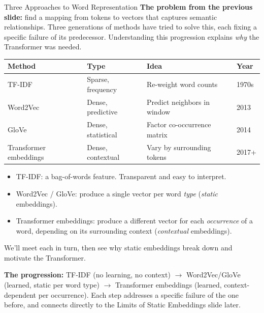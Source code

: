 \documentclass[10pt,english,aspectratio=169]{beamer}
\begin{document}
\begin{frame}{Three Approaches to Word Representation}
\textbf{The problem from the previous slide:} find a mapping from tokens to vectors that captures semantic relationships. Three generations of methods have tried to solve this, each fixing a specific failure of its predecessor. Understanding this progression explains \emph{why} the Transformer was needed.
\medskip
\begin{center}
\renewcommand{\arraystretch}{1.3}
\begin{tabular}{l l l l}
\toprule
\textbf{Method} & \textbf{Type} & \textbf{Idea} & \textbf{Year} \\
\midrule
TF-IDF & Sparse, frequency & Re-weight word counts & 1970s \\
Word2Vec & Dense, predictive & Predict neighbors in window & 2013 \\
GloVe & Dense, statistical & Factor co-occurrence matrix & 2014 \\
Transformer embeddings & Dense, contextual & Vary by surrounding tokens & 2017+ \\
\bottomrule
\end{tabular}
\end{center}

\medskip
\begin{itemize}
\item TF-IDF: a bag-of-words feature. Transparent and easy to interpret.
\item Word2Vec / GloVe: produce a single vector per word \emph{type} (\emph{static} embeddings).
\item Transformer embeddings: produce a different vector for each \emph{occurrence} of a word, depending on its surrounding context (\emph{contextual} embeddings).
\end{itemize}

\medskip
We'll meet each in turn, then see why static embeddings break down and motivate the Transformer.

\smallskip
\textbf{The progression:} TF-IDF (no learning, no context) $\to$ Word2Vec/GloVe (learned, static per word type) $\to$ Transformer embeddings (learned, context-dependent per occurrence). Each step addresses a specific failure of the one before, and connects directly to the Limits of Static Embeddings slide later.
\end{frame}
\end{document}
